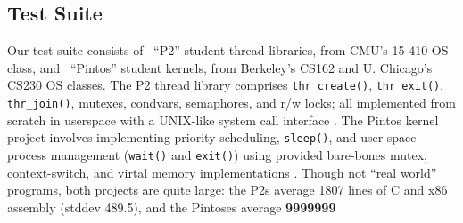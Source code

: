\subsection{Test Suite}
Our test suite consists of \numthrlibs~``P2'' student thread libraries, from CMU's 15-410 OS class,
and \numpintoses~``Pintos'' student kernels, from Berkeley's CS162 and U. Chicago's CS230 OS classes.
%
The P2 thread library comprises \texttt{thr\_create()}, \texttt{thr\_exit()}, \texttt{thr\_join()}, mutexes, condvars, semaphores, and r/w locks;
all implemented from scratch in userspace with a UNIX-like system call interface \cite{kspec,thrlib}.
%
The Pintos kernel project
involves implementing priority scheduling, \texttt{sleep()}, and user-space process management (\texttt{wait()} and \texttt{exit()})
using provided bare-bones mutex, context-switch, and virtal memory implementations
\cite{pintos}.
Though not ``real world'' programs, both projects are quite large: %
the P2s average 1807 lines of C and x86 assembly (stddev 489.5),
and the Pintoses average {\bf 9999999} %

